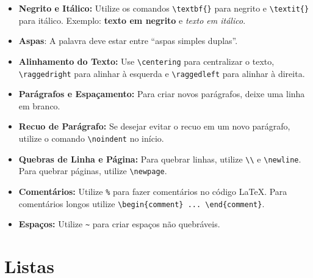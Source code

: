 \begin{itemize}
    \item \textbf{Negrito e Itálico:} Utilize os comandos \verb|\textbf{}| para negrito e \verb|\textit{}| para itálico. Exemplo: \textbf{texto em negrito} e \textit{texto em itálico}.
    
    \item \textbf{Aspas}: A palavra deve estar entre ``aspas simples duplas''.
    
    \item \textbf{Alinhamento do Texto:} Use \verb|\centering| para centralizar o texto, \verb|\raggedright| para alinhar à esquerda e \verb|\raggedleft| para alinhar à direita.
    
    \item \textbf{Parágrafos e Espaçamento:} Para criar novos parágrafos, deixe uma linha em branco.
    
    \item \textbf{Recuo de Parágrafo:} Se desejar evitar o recuo em um novo parágrafo, utilize o comando \verb|\noindent| no início.
    
    \item \textbf{Quebras de Linha e Página:} Para quebrar linhas, utilize \verb|\\| e \verb|\newline|. Para quebrar páginas, utilize \verb|\newpage|.
    
    \item \textbf{Comentários:} Utilize \verb|%| para fazer comentários no código LaTeX. Para comentários longos utilize  \verb|\begin{comment} ... \end{comment}|.
    
    \item \textbf{Espaços:} Utilize \verb|~| para criar espaços não quebráveis.

\end{itemize}

\section{Listas}
\label{sec:listas}

